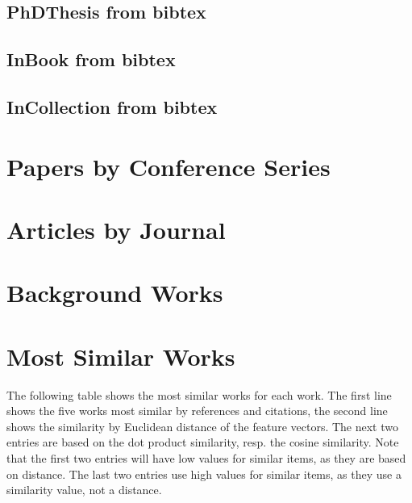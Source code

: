 \documentclass[a4paper]{article}
\begin{document}
\clearpage
\subsection{PhDThesis from bibtex}


\clearpage



\clearpage
\subsection{InBook from bibtex}


\clearpage
\subsection{InCollection from bibtex}


\clearpage


\clearpage
\section{Papers by Conference Series}



\clearpage
\section{Articles by Journal}



\clearpage
\section{Background Works}



\clearpage
\section{Most Similar Works}

The following table shows the most similar works for each work. The first line shows the five works most similar by references and citations, the second line shows the similarity by Euclidean distance of the feature vectors. The next two entries are based on the dot product similarity, resp. the cosine similarity. Note that the first two entries will have low values for similar items, as they are based on distance. The last two entries use high values for similar items, as they use a similarity value, not a distance.
\end{document}
